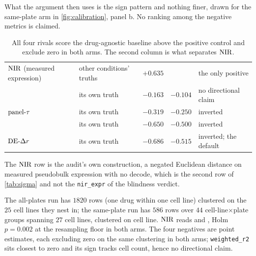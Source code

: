 What the argument then uses is the sign pattern and nothing finer, drawn for the
same-plate arm in \cref{fig:calibration}, panel b. No ranking among the negative
metrics is claimed.

\begin{table}[htbp]
\caption{ All
four rivals score the drug-agnostic baseline above the positive control and
exclude zero in both arms. The second column is what separates $\NIR$.}
\label{tab:drf}
\begin{fullwidth}
\begin{threeparttable}
\begin{tabularx}{\linewidth}{@{}Z{1.15} Z{1.0} r r Z{0.85}@{}}
 &  & 
  &  &  \\
\midrule
$\NIR$ (measured expression) & other conditions' truths & $+0.635$ & 
  & the only positive \\
\addlinespace[10pt]
 & its own truth & $-0.163$ & $-0.104$
  & no directional claim \\
$\textrm{panel-}\tau$ & its own truth & $-0.319$ & $-0.250$ & inverted \\
 & its own truth & $-0.650$ & $-0.500$ & inverted \\
$\textrm{DE-}\Delta r$ & its own truth & $-0.686$ & $-0.515$ & inverted; the default \\
\end{tabularx}
\begin{tablenotes}[flushleft]
\item The $\NIR$ row is the audit's own construction, a negated Euclidean
distance on measured pseudobulk expression with no decode, which is the second
row of \cref{tab:sigma} and not the \texttt{nir\_expr} of the blindness verdict.
\item The all-plates run has $\num{1820}$ rows (one drug within one cell line)
clustered on the $25$ cell lines they nest in; the same-plate run has
$\num{586}$ rows over $44$ cell-line$\times$plate groups spanning $27$ cell
lines, clustered on cell line. $\NIR$ reads  and
, Holm $p = 0.002$ at the resampling floor in both
arms. The four negatives are point estimates, each excluding zero on the same
clustering in both arms; \texttt{weighted\_r2} sits closest to zero and its sign
tracks cell count, hence no directional claim.
\end{tablenotes}
\end{threeparttable}
\end{fullwidth}
\end{table}


